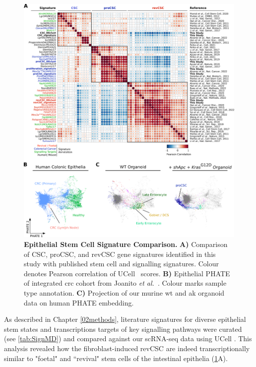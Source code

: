 \begin{figure}
    \centering
    \includegraphics{04seq/figs/4SEQ_StemSign.png}
    \caption{\textbf{Epithelial Stem Cell Signature Comparison.} \textbf{A)} Comparison of CSC, proCSC, and revCSC gene signatures identified in this study with published stem cell and signalling signatures. Colour denotes Pearson correlation of UCell~\cite{andreatta_ucell_2021} scores. \textbf{B)} Epithelial PHATE of integrated \acrshort{crc} cohort from Joanito \emph{et al.}~\cite{joanito_single-cell_2022}. Colour marks sample type annotation. \textbf{C)} Projection of our murine \acrshort{wt} and \acrshort{ak} organoid data on human PHATE embedding.}
    \label{fig:4sign}
\end{figure}

As described in Chapter \ref{02methods}, literature signatures for diverse epithelial stem states and transcriptions targets of key signalling pathways were curated (see \ref{tab:SignMD}) and compared against our scRNA-seq data using UCell \cite{andreatta_ucell_2021}. This analysis revealed how the fibroblast-induced revCSC are indeed transcriptionally similar to "foetal" \cite{mustata_identification_2013, yui_yaptaz-dependent_2018} and “revival" stem cells \cite{ayyaz_single-cell_2019} of the intestinal epithelia (\ref{fig:4sign}A). 

